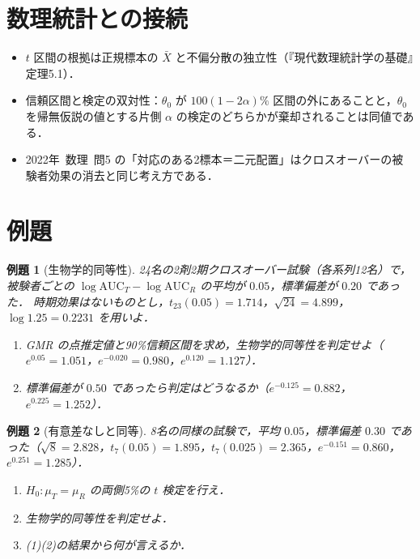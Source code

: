 \documentclass[a4paper,11pt,openany]{ltjsbook}
\newtheorem{reidai}{例題}[chapter]
\newcommand{\kakomonSM}[2]{\mbox{#1年 数理 問#2}}
\begin{document}
\section{数理統計との接続}\label{sec:13-link}
\begin{linkbox}
\begin{itemize}
\item $t$ 区間の根拠は正規標本の $\bar X$ と不偏分散の独立性（『現代数理統計学の基礎』定理5.1）．
\item 信頼区間と検定の双対性：$\theta_0$ が $100(1-2\alpha)\%$ 区間の外にあることと，$\theta_0$ を帰無仮説の値とする片側 $\alpha$ の検定のどちらかが棄却されることは同値である．
\item \kakomonSM{2022}{5} の「対応のある2標本＝二元配置」はクロスオーバーの被験者効果の消去と同じ考え方である．
\end{itemize}
\end{linkbox}

\section{例題}\label{sec:13-ex}
\begin{reidai}[生物学的同等性]\label{reidai:13-1}
24名の2剤2期クロスオーバー試験（各系列12名）で，被験者ごとの $\log\mathrm{AUC}_T-\log\mathrm{AUC}_R$ の平均が $0.05$，標準偏差が $0.20$ であった．
時期効果はないものとし，$t_{23}(0.05)=1.714$，$\sqrt{24}=4.899$，$\log1.25=0.2231$ を用いよ．
\begin{enumerate}[label=(\arabic*)]
\item GMR の点推定値と90\%信頼区間を求め，生物学的同等性を判定せよ（$e^{0.05}=1.051$，$e^{-0.020}=0.980$，$e^{0.120}=1.127$）．
\item 標準偏差が $0.50$ であったら判定はどうなるか（$e^{-0.125}=0.882$，$e^{0.225}=1.252$）．
\end{enumerate}
\end{reidai}

\begin{reidai}[有意差なしと同等]\label{reidai:13-2}
8名の同様の試験で，平均 $0.05$，標準偏差 $0.30$ であった（$\sqrt8=2.828$，$t_7(0.05)=1.895$，$t_7(0.025)=2.365$，$e^{-0.151}=0.860$，$e^{0.251}=1.285$）．
\begin{enumerate}[label=(\arabic*)]
\item $H_0:\mu_T=\mu_R$ の両側5\%の $t$ 検定を行え．
\item 生物学的同等性を判定せよ．
\item (1)(2)の結果から何が言えるか．
\end{enumerate}
\end{reidai}
\end{document}
